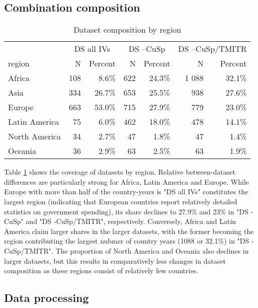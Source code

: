 \documentclass[11pt]{article}
\begin{document}
\subsection{Combination composition}
\label{app_cbncpsgn}
\begin{table}[ht]
\centering
\begin{tabular}{p{2.5cm}rrrrrr}
  \hline 
 & \multicolumn{2}{c}{DS all IVs} & \multicolumn{2}{c}{DS --CuSp} & \multicolumn{2}{c}{DS --CuSp/TMITR} \\ 
\cmidrule(r){2-3}\cmidrule(r){4-5}\cmidrule(r){6-7} 
 region & N & Percent & N & Percent & N & Percent \\ 
  \hline
Africa & 108 &  8.6\% & 622 & 24.3\% & 1 088 & 32.1\% \\ 
  Asia & 334 & 26.7\% & 653 & 25.5\% & 938 & 27.6\% \\ 
  Europe & 663 & 53.0\% & 715 & 27.9\% & 779 & 23.0\% \\ 
  Latin America & 75 &  6.0\% & 462 & 18.0\% & 478 & 14.1\% \\ 
  North America & 34 &  2.7\% & 47 &  1.8\% & 47 &  1.4\% \\ 
  Oceania & 36 &  2.9\% & 63 &  2.5\% & 63 &  1.9\% \\ 
   \hline
\end{tabular}
\caption{Dataset composition by region} 
\label{tbl:cbn_cpsgn}
\end{table}


Table \ref{tbl:cbn_cpsgn} shows the coverage of datasets by region. 
Relative between-dataset differences are particularly strong for Africa, Latin America and Europe.
While Europe with more than half of the country-years is "DS all IVs" constitutes the largest region (indicating that European countries report relatively detailed statistics on government spending), its share declines to 27.9\% and 23\% in "DS -CuSp" and "DS -CuSp/TMITR", respectively.
Conversely, Africa and Latin America claim larger shares in the larger datasets, with the former becoming the region contributing the largest nubmer of country years (1088 or 32.1\%) in "DS -CuSp/TMITR".
The proportion of North America and Oceania also declines in larger datasets, but this results in comparatively less changes in dataset composition as these regions consist of relatively few countries. 





\subsection{Data processing}
\label{app_data_processing}
\end{document}
